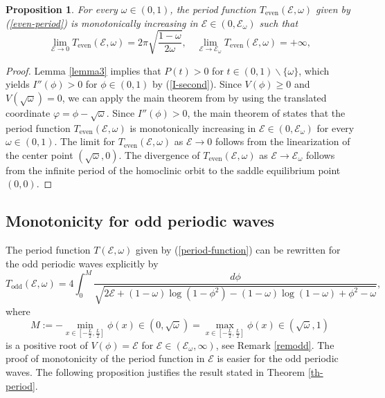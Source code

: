 \documentclass[12pt,reqno]{amsart}
\numberwithin{equation}{section}
\numberwithin{figure}{section}
\newtheorem{proposition}[theorem]{Proposition}
\begin{document}
\begin{proposition}
	\label{prop-even-period}
	For every $\omega \in (0,1)$, the period function $T_\mathrm{even}(\mathcal E,\omega)$ given by (\ref{even-period}) is monotonically increasing 
	in $\mathcal{E} \in (0,\mathcal{E}_{\omega})$ such that 
	$$
\lim_{\mathcal{E}\to 0} 	T_\mathrm{even}(\mathcal E,\omega) = 2\pi \sqrt{\frac{1-\omega}{2\omega}}, \quad 
\lim_{\mathcal{E}\to \mathcal{E}_{\omega}} T_\mathrm{even}(\mathcal E,\omega) = +\infty,
	$$  
\end{proposition}

	\begin{proof}
		Lemma \ref{lemma3} implies that $P(t) > 0$ for $t \in (0,1) \backslash \{\omega\}$, which yields $I''(\phi) > 0$ for $\phi \in (0,1)$ by (\ref{I-second}). Since $V(\phi) \geq 0$ and $V(\sqrt{\omega}) = 0$, we can apply the main theorem from \cite{chicone2} by using the translated coordinate $\varphi = \phi - \sqrt{\omega}$. Since $I''(\phi) > 0$, the main theorem of \cite{chicone2} states that the period function $T_\mathrm{even}(\mathcal E,\omega)$ is monotonically increasing in $\mathcal{E} \in (0,\mathcal{E}_{\omega})$ for every $\omega \in (0,1)$. The limit for $T_{\mathrm{even}}(\mathcal E,\omega)$ as 
		$\mathcal{E} \to 0$ follows from the linearization of the center 
		point $(\sqrt{\omega},0)$.
		The divergence of $T_\mathrm{even}(\mathcal E,\omega)$ as $\mathcal{E} \to \mathcal{E}_{\omega}$ follows from the infinite period of the homoclinic orbit to the saddle equilibrium point $(0,0)$. 
	\end{proof} 

\subsection{Monotonicity for odd periodic waves}
\label{sec-3-2}

The period function $T(\mathcal{E},\omega)$ given by (\ref{period-function}) 
can be rewritten for the odd periodic waves explicitly by
\begin{equation}
\label{odd-period}
T_\mathrm{odd}(\mathcal E, \omega) = 4 \int_0^{M} \frac{d \phi }{\sqrt{2\mathcal E + (1-\omega)\log(1-\phi^2) - (1-\omega) \log(1-\omega) + \phi^2 - \omega}},
\end{equation}
where 
$$
M := -\min\limits_{x\in [-\frac{L}{2},\frac{L}{2}]} \phi (x) \in (0,\sqrt{\omega}) = \max\limits_{x\in [-\frac{L}{2},\frac{L}{2}]} \phi(x)\in (\sqrt{\omega},1)
$$ 
is a positive root of 
$V(\phi) = \mathcal{E}$ for $\mathcal{E}\in (\mathcal{E}_{\omega},\infty)$, see Remark \ref{remodd}. 
The proof of monotonicity of the period function in $\mathcal{E}$ is easier for the odd periodic waves. The following proposition justifies the result stated in Theorem \ref{th-period}.
\end{document}
